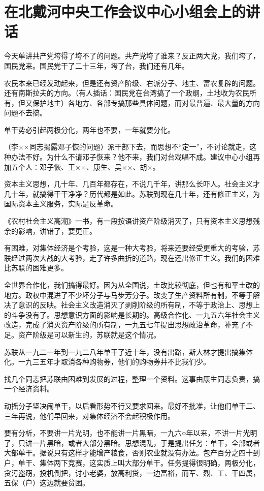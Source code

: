 \section[在北戴河中央工作会议中心小组会上的讲话（一九六二年八月九日）]{在北戴河中央工作会议中心小组会上的讲话}


今天单讲共产党垮得了垮不了的问题。共产党垮了谁来？反正两大党，我们垮了，国民党来。国民党干了二十三年，垮了台，我们还有几年。

农民本来已经发动起来，但是还有资产阶级、右派分子、地主、富农复辟的问题。还有南斯拉夫的方向。（有人插话：国民党在台湾搞了一个政纲，土地收为农民所有，但又保护地主）各地方、各部专搞那些具体问题，而对最普遍、最大量的方向问题不去搞。

单干势必引起两极分化，两年也不要，一年就要分化。

（李××同志揭露邓子恢的问题）派干部下去，而思想不“定一”，不讨论就走，这种办法不好。为什么不请邓子恢来？他不来，我们对台戏唱不成。建议中心小组再加五个人：邓子恢、王××、康生、吴××、胡×。

资本主义思想，几十年、几百年都存在，不说几千年，讲那么长吓人。社会主义才几十年，就搞得干干净净？历代都是如此。苏联到现在几十年，还有修正主义，为国际资本主义服务，实际是反革命。

《农村社会主义高潮》一书，有一段按语讲资产阶级消灭了，只有资本主义思想残余的影响，讲错了，要更正。

有困难，对集体经济是个考验，这是一种大考验，将来还要经受更重大的考验，苏联经过两次大战的大考验，走了许多曲折的道路，现在还出修正主义。我们的困难比苏联的困难更多。

全世界合作化，我们搞得最好。因为从全国说，土改比较彻底，但也有和平土改的地方。政权中混进了不少坏分子与马步芳分子。改变了生产资料所有制，不等于解决了意识的反映。社会主义改造消灭了剥削阶级的所有制，不等于政治上、思想上的斗争没有了。思想意识方面的影响是长期的。高级合作化、一九五六年社会主义改造，完成了消灭资产阶级的所有制，一九五七年提出思想政治革命，补充了不足。资产阶级是可以新生的，苏联就是这个情况。

苏联从一九二一年到一九二八年单干了近十年，没有出路，斯大林才提出搞集体化。一九三五年才取消各种购物券，他们的购物券并不比我们少。

找几个同志把苏联由困难到发展的过程，整理一个资料。这事由康生同志负责，搞一个经济资料。

动摇分子坚决闹单干，以后看形势不行又要求回来。最好不批准，让他们单干二、三年再说，他们早回来，对集体经济不会起积极作用。

要有分析，不要讲一片光明，也不能讲一片黑暗，一九六○年以来，不讲一片光明了，只讲一片黑暗，或者大部分黑暗。思想混乱，于是提出任务：单干，全部或者大部单干。据说只有这样才能增产粮食，否则农业就没有办法。包产百分之四十到户，单干、集体两下竞赛，这实质上叫大部分单干。任务提得很明确，两极分化，贪污盗窃，投机倒把，讨小老婆，放高利贷，一边富裕，而军、烈、工、干四属，五保（户）这边就要贫困。


